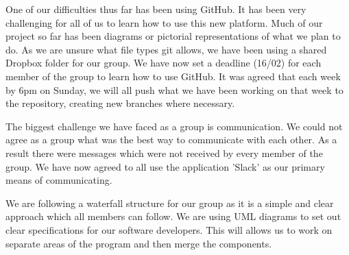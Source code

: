 \documentclass[11pt]{article}
\begin{document}
		One of our difficulties thus far has been using GitHub. It has been very challenging for all of us to learn how to use this new platform.  Much of our project so far has been diagrams or pictorial representations of what we plan to do. As we are unsure what file types git allows, we have been using a shared Dropbox folder for our group. We have now set a deadline (16/02) for each member of the group to learn how to use GitHub. It was agreed that each week by 6pm on Sunday, we will all push what we have been working on that week to the repository, creating new branches where necessary. 
		
		The biggest challenge we have faced as a group is communication. We could not agree as a group what was the best way to communicate with each other. As a result there were messages which were not received by every member of the group. We have now agreed to all use the application 'Slack' as our primary means of communicating. 
		
		We are following a waterfall structure for our group as it is a simple and clear approach which all members can follow. We are using UML diagrams to set out clear specifications for our software developers. This will allows us to work on separate areas of the program and then merge the components.  
	
%	
		



	
\end{document}
